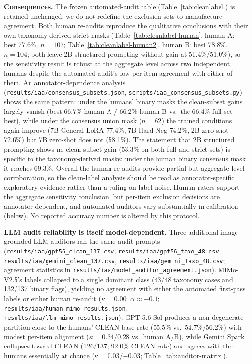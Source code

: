 \textbf{Consequences.} The frozen automated-audit table
(Table~\ref{tab:cleanlabel}) is retained unchanged; we do not redefine the
exclusion sets to manufacture agreement. Both human re-audits reproduce the
qualitative conclusions with their own taxonomy-derived strict masks
(Table~\ref{tab:cleanlabel-human}, human A: best 77.6\%, $n{=}107$;
Table~\ref{tab:cleanlabel-human2}, human B: best 78.8\%, $n{=}104$; both
leave 2B structured prompting without gain at 51.4\%/51.0\%), so the
sensitivity result is robust at the aggregate level across two independent
humans despite the automated audit's low per-item agreement with either of
them. An annotator-dependence analysis
(\texttt{results/iaa/consensus\_subsets.json},
\texttt{scripts/iaa\_consensus\_subsets.py}) shows the same pattern: under
the humans' binary masks the clean-subset gains largely vanish (best 66.7\%
human A / 66.2\% human B vs.\ the 66.4\% full-set best), while under the
consensus union mask ($n{=}62$) the trained conditions again improve (7B
General LoRA 77.4\%, 7B Hard-Neg 74.2\%, 2B zero-shot 72.6\%) but 7B
zero-shot does not (58.1\%). The statement that 2B structured prompting
shows no clean-subset gain (53.3\% on both full and strict sets) is specific
to the taxonomy-derived masks: under the human binary consensus mask it
reaches 69.3\%. Overall the human re-audits provide partial but
aggregate-level corroboration, so the clean-label analysis should be read as
annotator-specific exploratory evidence rather than a ruling on label noise.
Human raters support the aggregate sensitivity conclusion, but per-item
exclusion decisions are annotator-dependent, and automated auditors vary
substantially in calibration (below).
No reported accuracy number is altered by this protocol.

\textbf{LLM audit reliability is itself model-dependent.} Three additional
image-grounded LLM auditors ran the same audit prompts
(\texttt{results/iaa/gpt56\_clean\_137.csv},
\texttt{results/iaa/gpt56\_taxo\_48.csv},
\texttt{results/iaa/gemini\_clean\_137.csv},
\texttt{results/iaa/gemini\_taxo\_48.csv};
agreement statistics in
\texttt{results/iaa/model\_auditor\_agreement.json}).
MiMo-V2.5's labels collapsed to a single dominant class (43/48 taxonomy cases
and 132/137 binary flags), yielding no agreement with either the automated
first-pass labels or either human re-audit ($\kappa{=}0.00$;
$\alpha\approx-0.1$; \texttt{results/iaa/human\_mimo\_results.json},
\texttt{results/iaa/llm\_mimo\_results.json}). GPT-5.6 Sol produces a
non-degenerate partition close to the humans' CLEAN base rate (55.5\% vs.\
54.7\%/56.2\%) with modest per-item alignment ($\kappa{=}0.34$/0.28 vs.\ human
A/B), while Gemini Spark collapses toward CLEAN (126/137; 92.0\% CLEAN rate)
and agrees with the humans essentially at chance
($\kappa{=}0.03$/$-0.03$; Table~\ref{tab:auditor-matrix}).


